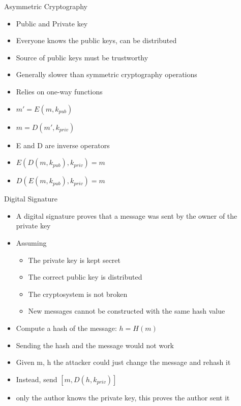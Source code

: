 \begin{withoutheadline}
\begin{frame}{Asymmetric Cryptography}
    \begin{itemize}
        \item Public and Private key
        \item Everyone knows the public keys, can be distributed
        \item Source of public keys must be trustworthy
        \item Generally slower than symmetric cryptography operations
        \item Relies on one-way functions
        \item $m' =E(m, k_{pub})$
        \item $m = D(m', k_{priv})$
        \item E and D are inverse operators
        \item $E(D(m, k_{pub}), k_{priv}) = m$
        \item $D(E(m, k_{pub}), k_{priv}) = m$
    \end{itemize}
\end{frame}

\begin{frame}{Digital Signature}
    \begin{itemize}
        \item A digital signature proves that a message was sent by the owner of the private key
        \item Assuming
        \begin{itemize}
            \item The private key is kept secret
            \item The correct public key is distributed
            \item The cryptosystem is not broken
            \item New messages cannot be constructed with the same hash value
        \end{itemize}
        \item Compute a hash of the message: $h=H(m)$
        \item Sending the hash and the message would not work
        \item Given m, h the attacker could just change the message and rehash it
        \item Instead, send $[m, D(h, k_{priv})]$
        \item only the author knows the private key, this proves the author sent it
    \end{itemize}
\end{frame}


\end{withoutheadline}
